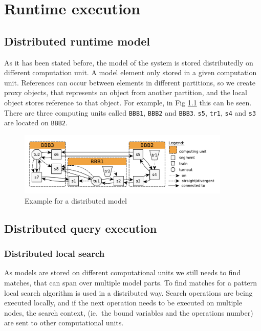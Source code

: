 %
\chapter{Runtime execution}
%


\section{Distributed runtime model}

As it has been stated before, the model of the system is stored distributedly on different computation unit. A model element only stored in a given computation unit. References can occur between elements in different partitions, so we create proxy objects, that represents an object from another partition, and the local object stores reference to that object. For example, in Fig \ref{fig:distrib-model-example} this can be seen. There are three computing units called \texttt{BBB1}, \texttt{BBB2} and \texttt{BBB3}. \texttt{s5}, \texttt{tr1}, \texttt{s4} and \texttt{s3} are located on \texttt{BBB2}. 

\begin{figure}[h]
	\begin{center}
		\includegraphics[width=0.9\textwidth]{figures/runtime-snapshot.pdf}
		\caption{Example for a distributed model}
		\label{fig:distrib-model-example}
	\end{center}
\end{figure}




\section{Distributed query execution}


\subsection{Distributed local search}

As models are stored on different computational units we still needs to find matches, that can span over multiple model parts. To find matches for a pattern local search algorithm is used in a distributed way. Search operations are being executed locally, and if the next operation needs to be executed on multiple nodes, the search context, (ie.\ the bound variables and the operations number) are sent to other computational units.

